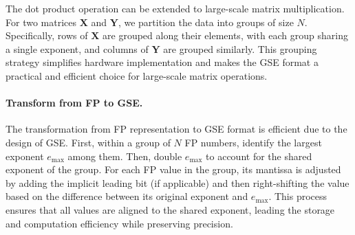 The dot product operation can be extended to large-scale matrix multiplication. For two matrices \( \mathbf{X} \) and \( \mathbf{Y} \), we partition the data into groups of size \( N \). Specifically, rows of \( \mathbf{X} \) are grouped along their elements, with each group sharing a single exponent, and columns of \( \mathbf{Y} \) are grouped similarly. This grouping strategy simplifies hardware implementation and makes the GSE format a practical and efficient choice for large-scale matrix operations.

\paragraph{Transform from FP to GSE.} 

The transformation from FP representation to GSE format is efficient due to the design of GSE. First, within a group of \( N \) FP numbers, identify the largest exponent \( e_{\text{max}} \) among them. Then, double \( e_{\text{max}} \) to account for the shared exponent of the group. For each FP value in the group, its mantissa is adjusted by adding the implicit leading bit (if applicable) and then right-shifting the value based on the difference between its original exponent and \( e_{\text{max}} \). This process ensures that all values are aligned to the shared exponent, leading the storage and computation efficiency while preserving precision.
